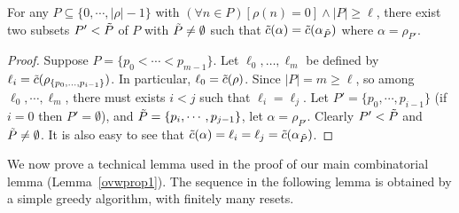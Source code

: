 \begin{lemma}\label{ovwprop0}
For any
$P\subseteq \{0,\cdots,|\rho|-1\}$ with
$(\forall n\in P)[\rho(n) = 0]
\wedge |P|\geq \ell$,
there exist two
subsets $P'<\tilde{P}$ of $P$
with $\tilde{P}\ne\emptyset$
such that $\tilde{c}(\alpha) = \tilde{c}(\alpha_{\tilde{P}})$ where $\alpha = \rho_{P'}$.
\end{lemma}
\begin{proof}
Suppose $P = \{p_0 < \cdots < p_{m-1}\}$.
Let $\ell_0, \dots, \ell_m$ be defined by
$\ell_i = \tilde{c}(\rho_{\{p_0, \dots, p_{i-1}\}})$. In particular, $\ell_0 = \tilde{c}(\rho)$.
Since $|P| = m \geq \ell$,
so among $\ell_0,\cdots, \ell_m$,
there must exists $i<j$ such
that $\ell_i=\ell_j$.
Let $P' = \{p_0,\cdots,p_{i-1}\}$
(if $i=0$ then $P' = \emptyset$), and
$\tilde{P} = \{p_i,\cdots,p_{j-1}\}$,
let $\alpha = \rho_{P'}$.
Clearly $P'<\tilde{P}$ and $\tilde{P}\ne\emptyset$.
It is also easy to see that
$\tilde{c}(\alpha) = \ell_i = \ell_j = \tilde{c}(\alpha_{\tilde{P}})$.
\end{proof}

We now prove a technical lemma used in the proof of our main combinatorial
lemma (Lemma~\ref{ovwprop1}). The sequence in the following lemma is obtained by a simple greedy algorithm, with finitely many resets.

